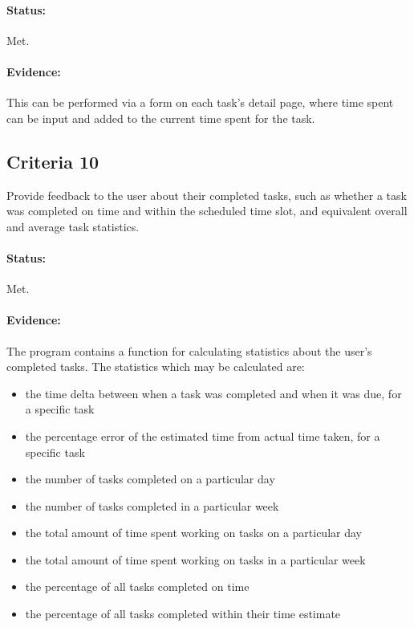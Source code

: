 \documentclass{article}
\begin{document}
\paragraph{Status:}
Met.

\paragraph{Evidence:}
This can be performed via a form on each task's detail page,
where time spent can be input and added to the current time spent for the task.

\subsection{Criteria 10}
Provide feedback to the user about their completed tasks,
such as whether a task was completed on time and within the scheduled time slot,
and equivalent overall and average task statistics.

\paragraph{Status:}
Met.

\paragraph{Evidence:}
The program contains a function for calculating statistics about the user's completed tasks.
The statistics which may be calculated are:
\begin{itemize}
  \item the time delta between when a task was completed and when it was due,
    for a specific task
  \item the percentage error of the estimated time from actual time taken,
    for a specific task
  \item the number of tasks completed on a particular day
  \item the number of tasks completed in a particular week
  \item the total amount of time spent working on tasks on a particular day
  \item the total amount of time spent working on tasks in a particular week
  \item the percentage of all tasks completed on time
  \item the percentage of all tasks completed within their time estimate
\end{itemize}
\end{document}
